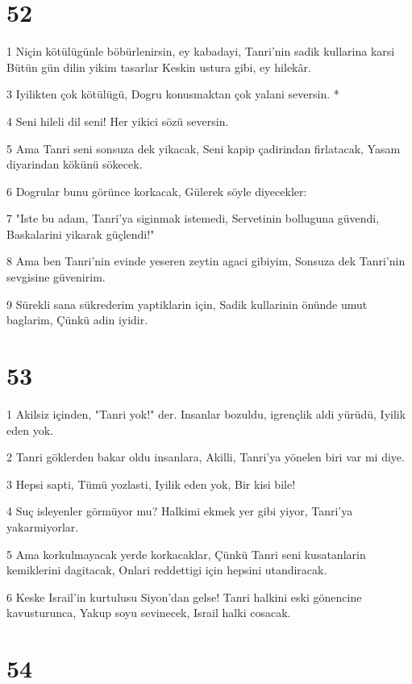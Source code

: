 \chapter{52}

\par 1 Niçin kötülügünle böbürlenirsin, ey kabadayi, Tanri'nin sadik kullarina karsi Bütün gün dilin yikim tasarlar Keskin ustura gibi, ey hilekâr.
\par 3 Iyilikten çok kötülügü, Dogru konusmaktan çok yalani seversin. *
\par 4 Seni hileli dil seni! Her yikici sözü seversin.
\par 5 Ama Tanri seni sonsuza dek yikacak, Seni kapip çadirindan firlatacak, Yasam diyarindan kökünü sökecek.
\par 6 Dogrular bunu görünce korkacak, Gülerek söyle diyecekler:
\par 7 "Iste bu adam, Tanri'ya siginmak istemedi, Servetinin bolluguna güvendi, Baskalarini yikarak güçlendi!"
\par 8 Ama ben Tanri'nin evinde yeseren zeytin agaci gibiyim, Sonsuza dek Tanri'nin sevgisine güvenirim.
\par 9 Sürekli sana sükrederim yaptiklarin için, Sadik kullarinin önünde umut baglarim, Çünkü adin iyidir.

\chapter{53}

\par 1 Akilsiz içinden, "Tanri yok!" der. Insanlar bozuldu, igrençlik aldi yürüdü, Iyilik eden yok.
\par 2 Tanri göklerden bakar oldu insanlara, Akilli, Tanri'ya yönelen biri var mi diye.
\par 3 Hepsi sapti, Tümü yozlasti, Iyilik eden yok, Bir kisi bile!
\par 4 Suç isleyenler görmüyor mu? Halkimi ekmek yer gibi yiyor, Tanri'ya yakarmiyorlar.
\par 5 Ama korkulmayacak yerde korkacaklar, Çünkü Tanri seni kusatanlarin kemiklerini dagitacak, Onlari reddettigi için hepsini utandiracak.
\par 6 Keske Israil'in kurtulusu Siyon'dan gelse! Tanri halkini eski gönencine kavusturunca, Yakup soyu sevinecek, Israil halki cosacak.

\chapter{54}

